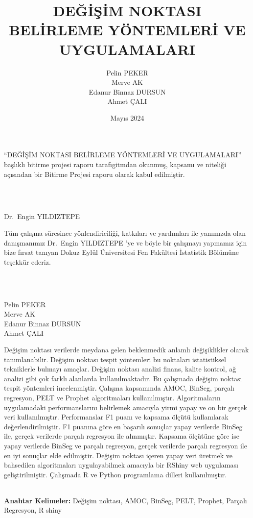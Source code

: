 \documentclass[12pt,twoside]{deuthesis}
\title{DEĞİŞİM NOKTASI BELİRLEME YÖNTEMLERİ VE UYGULAMALARI}
\author{Pelin PEKER \\ Merve AK \\ Edanur Binnaz DURSUN \\ Ahmet ÇALI} %
\date{Mayıs 2024}
\begin{document}
  \maketitle

\frontmatter %
\pagestyle{empty} %

\begin{preface}
	``DEĞİŞİM NOKTASI BELİRLEME YÖNTEMLERİ VE UYGULAMALARI'' başlıklı bitirme projesi raporu tarafıgitmdan okunmuş, kapsamı ve niteliği açısından bir Bitirme Projesi raporu olarak kabul edilmiştir.\\
\strut \\
\strut \\
Dr.~Engin YILDIZTEPE
\end{preface}

  \begin{acknowledgements}
    Tüm çalışma süresince yönlendiriciliği, katkıları ve yardımları ile yanımızda olan danışmanımız Dr.~Engin YILDIZTEPE 'ye ve böyle bir çalışmayı yapmamız için bize fırsat tanıyan Dokuz Eylül Üniversitesi Fen Fakültesi İstatistik Bölümüne teşekkür ederiz.\\
    \strut \\
    \strut \\
    Pelin PEKER\\
    Merve AK\\
    Edanur Binnaz DURSUN\\
    Ahmet ÇALI\\
  \end{acknowledgements}

\begin{abstractTR}
	Değişim noktası verilerde meydana gelen beklenmedik anlamlı değişiklikler olarak tanımlanabilir. Değişim noktası tespit yöntemleri bu noktaları istatistiksel tekniklerle bulmayı amaçlar. Değişim noktası analizi finans, kalite kontrol, ağ analizi gibi çok farklı alanlarda kullanılmaktadır. Bu çalışmada değişim noktası tespit yöntemleri incelenmiştir. Çalışma kapsamında AMOC, BinSeg, parçalı regresyon, PELT ve Prophet algoritmaları kullanılmıştır. Algoritmaların uygulamadaki performanslarını belirlemek amacıyla yirmi yapay ve on bir gerçek veri kullanılmıştır. Performanslar F1 puanı ve kapsama ölçütü kullanılarak değerlendirilmiştir. F1 puanına göre en başarılı sonuçlar yapay verilerde BinSeg ile, gerçek verilerde parçalı regresyon ile alınmıştır. Kapsama ölçütüne göre ise yapay verilerde BinSeg ve parçalı regresyon, gerçek verilerde parçalı regresyon ile en iyi sonuçlar elde edilmiştir. Değişim noktası içeren yapay veri üretmek ve bahsedilen algoritmaları uygulayabilmek amacıyla bir RShiny web uygulaması geliştirilmiştir. Çalışmada R ve Python programlama dilleri kullanılmıştır.\\
\strut \\

\textbf{Anahtar Kelimeler:} Değişim noktası, AMOC, BinSeg, PELT, Prophet, Parçalı Regresyon, R shiny
\end{abstractTR}
\end{document}
